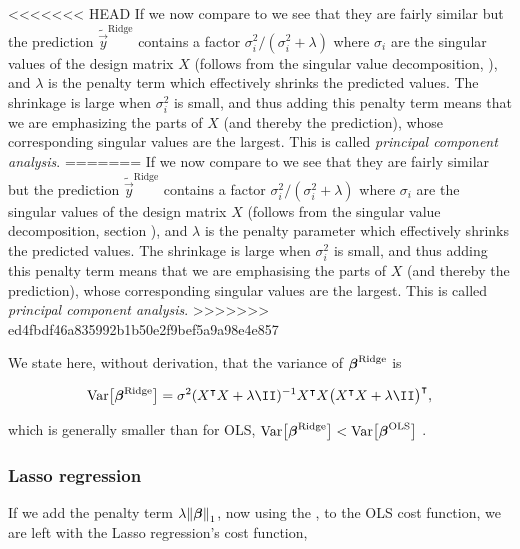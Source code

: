 <<<<<<< HEAD
If we now compare  to  we see that they are fairly similar but the prediction $\tilde{\vec{y}}^{\text{Ridge}}$ contains a factor $\sigma_i^2/(\sigma_i^2 + \lambda)$ where $\sigma_i$ are the singular values of the design matrix $X$ (follows from the singular value decomposition, ), and $\lambda$ is the penalty term which effectively shrinks the predicted values. The shrinkage is large when $\sigma_i^2$ is small, and thus adding this penalty term means that we are emphasizing the parts of $X$ (and thereby the prediction), whose corresponding singular values are the largest. This is called \textit{principal component analysis}.
=======
If we now compare  to  we see that they are fairly similar but the prediction $\tilde{\vec{y}}^{\text{Ridge}}$ contains a factor $\sigma_i^2/(\sigma_i^2 + \lambda)$ where $\sigma_i$ are the singular values of the design matrix $X$ (follows from the singular value decomposition, section ), and $\lambda$ is the penalty parameter which effectively shrinks the predicted values. The shrinkage is large when $\sigma_i^2$ is small, and thus adding this penalty term means that we are emphasising the parts of $X$ (and thereby the prediction), whose corresponding singular values are the largest. This is called \textit{principal component analysis}.
>>>>>>> ed4fbdf46a835992b1b50e2f9bef5a9a98e4e857


We state here, without derivation, that the variance of $\boldsymbol{\beta}^\text{Ridge}$ is 

\begin{align*}
    \variance{\svec{\beta}^\text{Ridge}} = \sigma^2 (\hessian + \lambda\II )^{-1} \hessian \big(\hessian + \lambda \II\big)\TT,
\end{align*}

which is generally smaller than for OLS, $\text{Var}\big[\boldsymbol{\beta}^\text{Ridge}\big] <\text{Var}\big[\boldsymbol{\beta}^\text{OLS}\big]$ \citep{mhjensen}.



\subsubsection{Lasso regression}\label{sec:Lasso}

If we add the penalty term $\lambda \norm{\boldsymbol{\beta}}_1$, now using the \footnotemark, to the OLS cost function, we are left with the Lasso regression's cost function,

